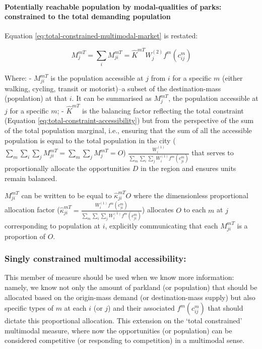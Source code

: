 \documentclass[
11pt, %
oneside, %
english, %
singlespacing, %
]{macthesis} %
\begin{document}
\paragraph{Potentially reachable population by modal-qualities of parks: constrained to the total demanding population}\label{potentially-reachable-population-by-modal-qualities-of-parks-constrained-to-the-total-demanding-population}

Equation \ref{eq:total-constrained-multimodal-market} is restated:

\begin{equation}
\label{eq:total-constrained-multimodal-market}
M^{mT}_{j} = \sum_i M^{mT}_{ji} = \hat K^{mT} W_j^{(2)} f^m(c^m_{ij})
\end{equation} 

Where:
- \(M^{mT}_{ji}\) is the population accessible at \(j\) from \(i\) for a specific \(m\) (either walking, cycling, transit or motorist)--a subset of the destination-mass (population) at that \(i\). It can be summarised as \(M^{mT}_{j}\), the population accessible at \(j\) for a specific \(m\);
- \(\hat K^{mT}\) is the balancing factor reflecting the total constraint (Equation \ref{eq:total-constraint-accessibility}) but from the perspective of the sum of the total population marginal, i.e., ensuring that the sum of all the accessible population is equal to the total population in the city (\(\sum_m \sum_i\sum_j M^{mT}_{ji} = \sum_m \sum_j M^{mT}_{j} = O\)) \(\frac{W^{(1)}_i}{\sum_m\sum_i\sum_j W^{(1)}_if^m(c^m_{ji})}\) that serves to proportionally allocate the opportunities \(D\) in the region and ensures units remain balanced.

\(M_{ji}^{mT}\) can be written to be equal to \(\hat \kappa_{ji}^{mT} O\) where the dimensionless proportional allocation factor (\(\hat \kappa_{ji}^{mT} = \frac{W_i^{(1)} f^m(c^m_{ji})}{\sum_m\sum_i\sum_j W^{(1)}_if^m(c^m_{ji})}\)) allocates \(O\) to each \(m\) at \(j\) corresponding to population at \(i\), explicitly communicating that each \(M_{ji}^{mT}\) is a proportion of \(O\).

\subsubsection{Singly constrained multimodal accessibility:}\label{singly-constrained-multimodal-accessibility}

This member of measure should be used when we know more information: namely, we know not only the amount of parkland (or population) that should be allocated based on the origin-mass demand (or destination-mass supply) but also specific types of \(m\) at each \(i\) (or \(j\)) and their associated \(f^m(c^m_{ij})\) that should dictate this proportional allocation. This extension on the `total constrained' multimodal measure, where now the opportunities (or population) can be considered competitive (or responding to competition) in a multimodal sense.
\end{document}

